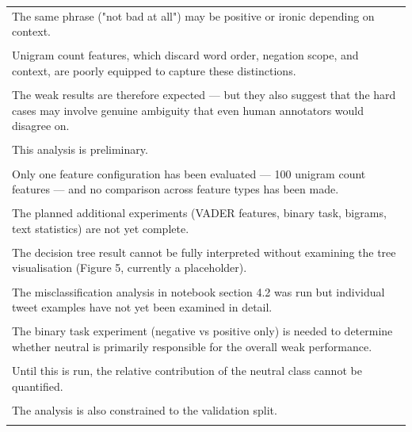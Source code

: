 \documentclass[11pt]{article}
\begin{document}
\begin{longtable}{|p{\dimexpr\linewidth-2\tabcolsep-2\arrayrulewidth\relax}|}
\hline
\rule{0pt}{3.5cm} \\
\hline
The same phrase ("not bad at all") may be positive or ironic depending on context. \\[2pt]
\hline
\rule{0pt}{3.5cm} \\
\hline
Unigram count features, which discard word order, negation scope, and context, are poorly equipped to capture these distinctions. \\[2pt]
\hline
\rule{0pt}{3.5cm} \\
\hline
The weak results are therefore expected --- but they also suggest that the hard cases may involve genuine ambiguity that even human annotators would disagree on. \\[2pt]
\hline
\rule{0pt}{3.5cm} \\
\hline
This analysis is preliminary. \\[2pt]
\hline
\rule{0pt}{3.5cm} \\
\hline
Only one feature configuration has been evaluated --- 100 unigram count features --- and no comparison across feature types has been made. \\[2pt]
\hline
\rule{0pt}{3.5cm} \\
\hline
The planned additional experiments (VADER features, binary task, bigrams, text statistics) are not yet complete. \\[2pt]
\hline
\rule{0pt}{3.5cm} \\
\hline
The decision tree result cannot be fully interpreted without examining the tree visualisation (Figure 5, currently a placeholder). \\[2pt]
\hline
\rule{0pt}{3.5cm} \\
\hline
The misclassification analysis in notebook section 4.2 was run but individual tweet examples have not yet been examined in detail. \\[2pt]
\hline
\rule{0pt}{3.5cm} \\
\hline
The binary task experiment (negative vs positive only) is needed to determine whether neutral is primarily responsible for the overall weak performance. \\[2pt]
\hline
\rule{0pt}{3.5cm} \\
\hline
Until this is run, the relative contribution of the neutral class cannot be quantified. \\[2pt]
\hline
\rule{0pt}{3.5cm} \\
\hline
The analysis is also constrained to the validation split. \\[2pt]
\hline
\rule{0pt}{3.5cm} \\

\end{longtable}
\end{document}
